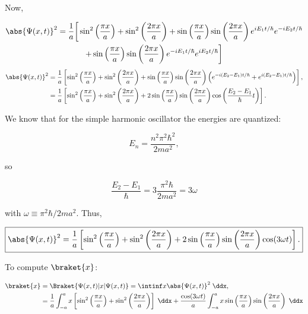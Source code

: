 \begin{parts}
Now,

\begin{multline*}
    \abs{\Psi(x,t)}^2 = \frac{1}{a} \bigg[ \sin^2\left( \frac{\pi x}{a} \right) + \sin^2\left( \frac{2\pi x}{a} \right) + \sin\left( \frac{\pi x}{a} \right)\sin\left( \frac{2\pi x}{a} \right)e^{iE_1t/\hbar}e^{-iE_2t/\hbar}\\
    + \sin\left( \frac{\pi x}{a} \right)\sin\left( \frac{2\pi x}{a} \right)e^{-iE_1t/\hbar}e^{iE_2t/\hbar} \bigg]
\end{multline*}
\begin{align*}
    \abs{\Psi(x,t)}^2 &= \frac{1}{a} \left[ \sin^2\left( \frac{\pi x}{a} \right) + \sin^2\left( \frac{2\pi x}{a} \right) + \sin\left( \frac{\pi x}{a} \right)\sin\left( \frac{2\pi x}{a} \right)\left( e^{-i(E_2-E_1)t/\hbar} + e^{i(E_2-E_1)t/\hbar} \right) \right], \\
    &= \frac{1}{a} \left[ \sin^2\left( \frac{\pi x}{a} \right) + \sin^2\left( \frac{2\pi x}{a} \right) + 2\sin\left( \frac{\pi x}{a} \right)\sin\left( \frac{2\pi x}{a} \right)\cos\left( \frac{E_2-E_1}{\hbar}t \right) \right].
\end{align*}

We know that for the simple harmonic oscillator the energies are quantized:

\begin{equation*}
    E_n = \frac{n^2\pi^2\hbar^2}{2ma^2},
\end{equation*}

so

\begin{equation*}
    \frac{E_2-E_1}{\hbar} = 3\frac{\pi^2\hbar}{2ma^2} = 3\omega
\end{equation*}

with $\omega \equiv \pi^2\hbar/2ma^2$. Thus,

\begin{equation*}
    \boxed{\abs{\Psi(x,t)}^2 = \frac{1}{a} \left[ \sin^2\left( \frac{\pi x}{a} \right) + \sin^2\left( \frac{2\pi x}{a} \right) + 2\sin\left( \frac{\pi x}{a} \right)\sin\left( \frac{2\pi x}{a} \right)\cos(3\omega t) \right].}
\end{equation*}




\item To compute $\braket{x}$:

\begin{align*}
    \braket{x} &= \Braket{\Psi(x,t) | x | \Psi(x,t)} = \intinf x\abs{\Psi(x,t)}^2 \;\ddx, \\
    &= \frac{1}{a}\int_{-a}^a x\left[ \sin^2\left( \frac{\pi x}{a} \right) + \sin^2\left( \frac{2\pi x}{a} \right) \right]\;\ddx + \frac{\cos(3\omega t)}{a} \int_{-a}^a x\sin\left( \frac{\pi x}{a} \right)\sin\left( \frac{2\pi x}{a} \right) \;\ddx
\end{align*}


\end{parts}
